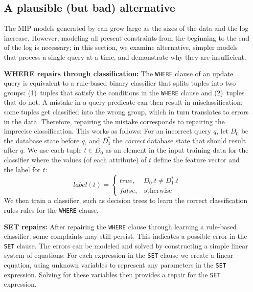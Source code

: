 
\subsection{A plausible (but bad) alternative}
\label{sec:dt}


The MIP models generated by \sys can grow large as the sizes of the
data and the log increase. However, modeling all present constraints
from the beginning to the end of the log is necessary; in this
section, we examine alternative, simpler models that process a single
query at a time, and demonstrate why they are insufficient.

\smallskip
\noindent
\textbf{WHERE repairs through classification:}
The \texttt{WHERE} clause of an update query is equivalent to a
rule-based binary classifier that splits tuples into two groups:
(1)~tuples that satisfy the conditions in the \texttt{WHERE} clause
and (2)~tuples that do not. A mistake in a query predicate can then
result in misclassification: some tuples get classified into the wrong
group, which in turn translates to errors in the data. Therefore,
repairing the mistake corresponds to repairing the imprecise
classification. This works as follows: For an incorrect query $q$, let
$D_0$ be the database state before $q$, and $D_1^*$ the \emph{correct}
database state that should result after $q$.
We use each tuple $t \in D_0$ as an element in the input training data
for the classifier where the values (of each attribute) of $t$ define
the feature vector and the label for $t$:
	\[
    label(t)= 
    \begin{cases}
    true ,& D_0.t \neq D_1^*.t\\
    false,              & \text{otherwise}
    \end{cases}
\]
We then train a classifier, such as decision trees \cite{???} to learn
the correct classification rules rules for the \texttt{WHERE} clause.


\smallskip
\noindent
\textbf{SET repairs:}
After repairing the \texttt{WHERE} clause through learning a
rule-based classifier, some complaints may still persist. This
indicates a possible error in the \texttt{SET} clause. The errors can
be modeled and solved by constructing a simple linear system of
equations: For each expression in the \texttt{SET} clause we create a
linear equation, using unknown variables to represent any parameters
in the \texttt{SET} expression. Solving for these variables then
provides a repair for the \texttt{SET} expression.


